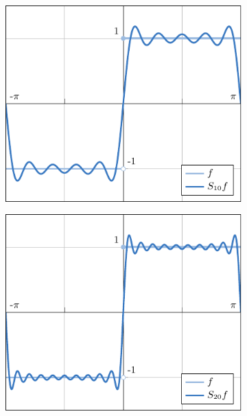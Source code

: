 \documentclass[a4paper, 12pt]{book}
\begin{document}
\begin{figure}[H]
\centering
\begin{subfigure}[b]{0.49\textwidth}
    \centering
    \includegraphics{./plot1/main.pdf}
\end{subfigure}
\begin{subfigure}[b]{0.49\textwidth}
    \centering
    \includegraphics{./plot2/main.pdf}
\end{subfigure}
\par\bigskip
\begin{subfigure}[b]{0.49\textwidth}
    \centering

\end{subfigure}
\end{figure}
\end{document}
